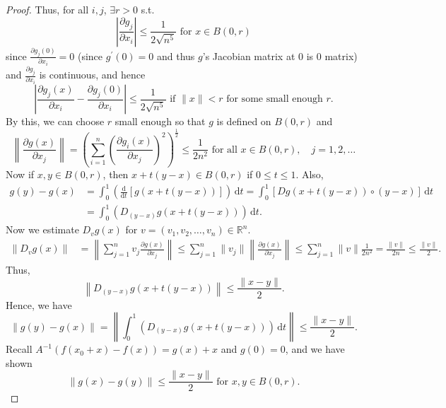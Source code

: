 \begin{proof}
    Thus, for all \(i, j\), \(\exists r > 0\) s.t. 
    \[
        \left\vert \frac{\partial g_j}{\partial x_i}  \right\vert \le \frac{1}{2\sqrt{n^5}} \text{ for } x \in B(0, r)  
    \]     
    since \(\frac{\partial g_j(0)}{\partial x_i} = 0\) (since \(g^{\prime} (0) = 0\) and thus \(g\)'s Jacobian matrix at \(0\) is \(0\) matrix) and \(\frac{\partial g_j}{\partial x_i} \) is continuous,  and hence
    \[
        \left\vert \frac{\partial g_j(x)}{\partial x_i} - \frac{\partial g_j(0)}{\partial x_i}   \right\vert\le \frac{1}{2\sqrt{n^5} } \text{ if } \lVert x \rVert < r \text{ for some small enough } r.   
    \] 
    By this, we can choose \(r\) small enough so that \(g\) is defined on \(B(0, r)\) and  
    \[
        \left\lVert \frac{\partial g(x)}{\partial x_j}  \right\rVert = \left( \sum_{i=1}^n \left( \frac{\partial g_i(x)}{\partial x_j}  \right)^2   \right)^{\frac{1}{2}}  \le \frac{1}{2n^2} \text{ for all } x \in B(0, r), \quad j = 1,2,\dots   
    \]
    Now if \(x, y \in B(0, r)\), then \(x + t(y - x) \in B(0, r)\) if \(0 \le t \le 1\). Also, 
    \begin{align*}
        g(y) - g(x) &= \int _0^1 \left( \frac{\mathrm{d}}{\mathrm{d}t} \left[ g(x + t (y - x)) \right]   \right) \, \mathrm{d} t = \int _0^1 \left[ Dg(x + t(y - x)) \circ (y - x) \right] \, \mathrm{d} t \\
        &= \int _0^1 \left( D_{(y-x)} g(x + t(y - x)) \right) \, \mathrm{d} t.     
    \end{align*}
    Now we estimate \(D_v g(x)\) for \(v = (v_1, v_2, \dots , v_n) \in \mathbb{R} ^n\). 
    \begin{align*}
        \lVert D_v g(x) \rVert &= \left\lVert \sum_{j=1}^n v_j \frac{\partial g(x)}{\partial x_j}   \right\rVert \le \sum_{j=1}^n \lVert v_j \rVert \left\lVert \frac{\partial g(x)}{\partial x_j}  \right\rVert \le \sum_{j=1}^n \lVert v \rVert \frac{1}{2n^2} = \frac{\lVert v \rVert }{2n} \le \frac{\lVert v \rVert }{2}.       
    \end{align*}    
    Thus, 
    \[
        \left\lVert D_{(y-x)} g(x + t(y - x)) \right\rVert \le \frac{\lVert x - y \rVert }{2}. 
    \]
    Hence, we have 
    \[
        \left\lVert g(y) - g(x) \right\rVert = \left\lVert \int _0^1 \left( D_{(y-x)} g(x + t (y - x)) \right) \, \mathrm{d} t   \right\rVert \le \frac{\lVert x - y \rVert }{2}.  
    \]    
    Recall \(A^{-1} (f(x_0 + x) - f(x)) = g(x) + x\) and \(g(0) = 0\), and we have shown
    \[
        \lVert g(x) - g(y) \rVert \le \frac{\lVert x - y \rVert }{2} \text{ for } x, y \in B(0, r).  
    \]  

\end{proof}
